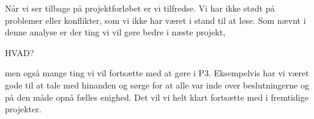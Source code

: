 Når vi ser tilbage på projektforløbet er vi tilfredse. Vi har ikke stødt på problemer eller konflikter, som vi ikke har været i stand til at løse. Som nævnt i denne analyse er der ting vi vil gøre bedre i næste projekt,


HVAD?


 men også mange ting vi vil fortsætte med at gøre i P3. Eksempelvis har vi været gode til at tale med hinanden og sørge for at alle var inde over beslutningerne og på den måde opnå fælles enighed. Det vil vi helt klart fortsætte med i fremtidige projekter. 

